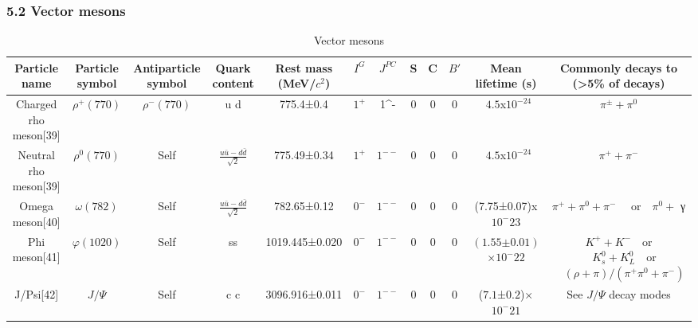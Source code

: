 \subsubsection{5.2 Vector mesons}
\begin{table}[ht]
\centering
\caption{Vector mesons}\label{tab_JZ6}
\begin{tabular}{|c|c|c|c|c|c|c|c|c|c|c|c|}
\hline
Particle name & Particle
symbol & Antiparticle
symbol & Quark
content &  Rest mass (MeV/$c^2$)	 & $I^G$ & $J^{PC}$&S & C & $B'$ & Mean lifetime (s) &Commonly decays to
(>5\% of decays)\\
\hline
Charged rho meson[39] & $\rho^+(770)$ & $\rho^-(770)$ & u d &  775.4±0.4   & $1^+$ & 1^- & 0 &0 & 0 & ~$4.5$x$10^{-24}$ & $\pi^\pm+\pi^0$ \\
\hline
Neutral rho meson[39] & $\rho^0(770)$ & Self & $\frac{u\bar u-d\bar d}{\sqrt{2}}$ & 775.49±0.34  & $1^+$ & $1^{--}$ & 0 & 0 & 0 & ~$4.5$x$10^{-24}$ & $\pi^+ +\pi^-$ \\
\hline
Omega meson[40] &  $\omega(782)$&Self &  $\frac{u\bar u-d\bar d}{\sqrt{2}}$& 782.65±0.12  & $0^-$ & $1^{--}$ & 0 & 0 &0 &(7.75±0.07)x$10^-{23}$& $\pi^+ +\pi^0 +\pi^-  \quad$ or$\quad \pi^0+$ γ\\
\hline
Phi meson[41] & $\varphi(1020)$ & Self & ss &  1019.445±0.020&  $0^-$ & $1^{--}$  & 0 & 0 & 0& $(1.55\text{±}0.01)$×$10^-22$ & $K^+ +K^- \quad$or $\quad K^0_s + K^0_L \quad$or $\quad (\rho +\pi)/(\pi^+\pi^0 +\pi^-)$ \\
\hline
J/Psi[42] & $J/\Psi$ & Self & c c &  3096.916±0.011 & $0^-$ & $1^{--}$  & 0 & 0 & 0 & ($7.1$±$0.2$)×$10^-21$ & See $J/\Psi$  decay modes\\
\hline



\end{tabular}
\end{table}
